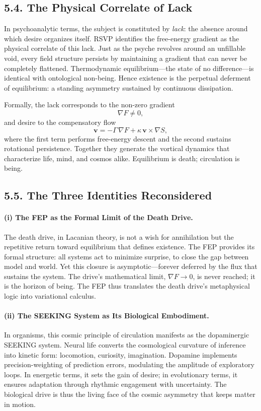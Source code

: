 \documentclass[12pt,a4paper]{article}
\begin{document}
\subsection{5.4. The Physical Correlate of Lack}

In psychoanalytic terms, the subject is constituted by \emph{lack}: the absence around which desire organizes itself.  
RSVP identifies the free-energy gradient as the physical correlate of this lack.  
Just as the psyche revolves around an unfillable void, every field structure persists by maintaining a gradient that can never be completely flattened.  
Thermodynamic equilibrium—the state of no difference—is identical with ontological non-being.  
Hence existence is the perpetual deferment of equilibrium: a standing asymmetry sustained by continuous dissipation.

Formally, the lack corresponds to the non-zero gradient
\[
\nabla F \neq 0,
\]
and desire to the compensatory flow
\[
\mathbf{v} = -\Gamma\,\nabla F + \kappa\,\mathbf{v}\!\times\!\nabla S,
\]
where the first term performs free-energy descent and the second sustains rotational persistence.  
Together they generate the vortical dynamics that characterize life, mind, and cosmos alike.  
Equilibrium is death; circulation is being.

\subsection{5.5. The Three Identities Reconsidered}

\paragraph{(i) The FEP as the Formal Limit of the Death Drive.}
The death drive, in Lacanian theory, is not a wish for annihilation but the repetitive return toward equilibrium that defines existence.  
The FEP provides its formal structure: all systems act to minimize surprise, to close the gap between model and world.  
Yet this closure is asymptotic—forever deferred by the flux that sustains the system.  
The drive’s mathematical limit, \(\nabla F \to 0\), is never reached; it is the horizon of being.  
The FEP thus translates the death drive’s metaphysical logic into variational calculus.

\paragraph{(ii) The SEEKING System as Its Biological Embodiment.}
In organisms, this cosmic principle of circulation manifests as the dopaminergic SEEKING system.  
Neural life converts the cosmological curvature of inference into kinetic form: locomotion, curiosity, imagination.  
Dopamine implements precision-weighting of prediction errors, modulating the amplitude of exploratory loops.  
In energetic terms, it sets the gain of desire; in evolutionary terms, it ensures adaptation through rhythmic engagement with uncertainty.  
The biological drive is thus the living face of the cosmic asymmetry that keeps matter in motion.
\end{document}
